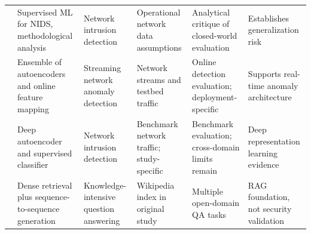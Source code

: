 \documentclass[conference]{IEEEtran}
\begin{document}
\begin{table}[t]
\begin{tabularx}{\textwidth}{c Y Y Y Y Y}
\cite{SommerPaxson} & Supervised ML for NIDS, methodological analysis & Network intrusion detection & Operational network data assumptions & Analytical critique of closed-world evaluation & Establishes generalization risk\\
\cite{Mirsky2018} & Ensemble of autoencoders and online feature mapping & Streaming network anomaly detection & Network streams and testbed traffic & Online detection evaluation; deployment-specific & Supports real-time anomaly architecture\\
\cite{Shone2018} & Deep autoencoder and supervised classifier & Network intrusion detection & Benchmark network traffic; study-specific & Benchmark evaluation; cross-domain limits remain & Deep representation learning evidence\\
\cite{Lewis2020} & Dense retrieval plus sequence-to-sequence generation & Knowledge-intensive question answering & Wikipedia index in original study & Multiple open-domain QA tasks & RAG foundation, not security validation\\
\bottomrule
\end{tabularx}
\end{table}
\end{document}
